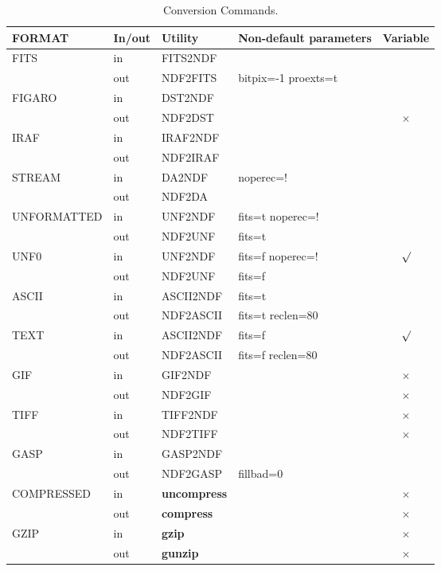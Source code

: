 \documentclass[twoside,11pt]{article}
\newcommand{\htmlref}[2]{#1}
\begin{document}
\begin{table}[ht]
\begin{center}
\begin{tabular}{|llllc|}
\hline
FORMAT & In/out & Utility & Non-default parameters & Variable \\
\hline
FITS & in & \htmlref{FITS2NDF}{FITS2NDF} & & \\
& out & \htmlref{NDF2FITS}{NDF2FITS} & bitpix=-1 proexts=t & \\
FIGARO & in & \htmlref{DST2NDF}{DST2NDF} & & \\
& out & \htmlref{NDF2DST}{NDF2DST} & & $\times$ \\
IRAF & in & \htmlref{IRAF2NDF}{IRAFNDF} & & \\
& out & \htmlref{NDF2IRAF}{NDF2IRAF} & & \\
STREAM & in & \htmlref{DA2NDF}{DA2NDF} & noperec=! & \\
& out & \htmlref{NDF2DA}{NDF2DA} & & \\
UNFORMATTED & in & \htmlref{UNF2NDF}{UNF2NDF} & fits=t noperec=! & \\
& out & \htmlref{NDF2UNF}{NDF2UNF} & fits=t & \\
UNF0 & in & \htmlref{UNF2NDF}{UNF2NDF} & fits=f noperec=! &  $\surd$ \\
& out & \htmlref{NDF2UNF}{NDF2UNF} & fits=f & \\
ASCII & in & \htmlref{ASCII2NDF}{ASCII2NDF} & fits=t & \\
& out & \htmlref{NDF2ASCII}{NDF2ASCII} & fits=t reclen=80 & \\
TEXT & in & \htmlref{ASCII2NDF}{ASCII2NDF} & fits=f &  $\surd$ \\
& out & \htmlref{NDF2ASCII}{ASCII2NDF} & fits=f reclen=80 & \\
GIF & in & \htmlref{GIF2NDF}{GIF2NDF} & & $\times$ \\
& out & \htmlref{NDF2GIF}{NDF2GIF} & & $\times$ \\
TIFF & in & \htmlref{TIFF2NDF}{TIFF2NDF} & & $\times$ \\
& out & \htmlref{NDF2TIFF}{NDF2TIFF} & & $\times$ \\
GASP & in & \htmlref{GASP2NDF}{GASP2NDF} & & \\
& out & \htmlref{NDF2GASP}{NDF2GASP} & fillbad=0 & \\
COMPRESSED & in & {\bf uncompress} & & $\times$ \\
& out & {\bf compress} & & $\times$ \\
GZIP & in & {\bf gzip} & & $\times$ \\
& out & {\bf gunzip} & & $\times$ \\
\hline
\end{tabular}
\caption{\label{tab:conversions}Conversion Commands.}
\end{center}
\end{table}
\end{document}
